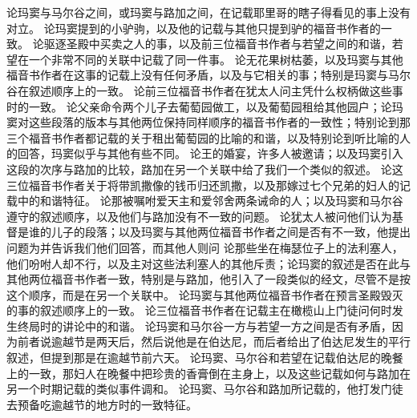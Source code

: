 论玛窦与马尔谷之间，或玛窦与路加之间，在记载耶里哥的瞎子得看见的事上没有对立。\newline{} 论玛窦提到的小驴驹，以及他的记载与其他只提到驴的福音书作者的一致。\newline{} 论驱逐圣殿中买卖之人的事，以及前三位福音书作者与若望之间的和谐，若望在一个非常不同的关联中记载了同一件事。\newline{} 论无花果树枯萎，以及玛窦与其他福音书作者在这事的记载上没有任何矛盾，以及与它相关的事；特别是玛窦与马尔谷在叙述顺序上的一致。\newline{} 论前三位福音书作者在犹太人问主凭什么权柄做这些事时的一致。\newline{} 论父亲命令两个儿子去葡萄园做工，以及葡萄园租给其他园户；论玛窦对这些段落的版本与其他两位保持同样顺序的福音书作者的一致性；特别论到那三个福音书作者都记载的关于租出葡萄园的比喻的和谐，以及特别论到听比喻的人的回答，玛窦似乎与其他有些不同。\newline{} 论王的婚宴，许多人被邀请；以及玛窦引入这段的次序与路加的比较，路加在另一个关联中给了我们一个类似的叙述。\newline{} 论这三位福音书作者关于将带凯撒像的钱币归还凯撒，以及那嫁过七个兄弟的妇人的记载中的和谐特征。\newline{} 论那被嘱咐爱天主和爱邻舍两条诫命的人；以及玛窦和马尔谷遵守的叙述顺序，以及他们与路加没有不一致的问题。\newline{} 论犹太人被问他们认为基督是谁的儿子的段落；以及玛窦与其他两位福音书作者之间是否有不一致，他提出问题为并告诉我们他们回答，而其他人则问\newline{} 论那些坐在梅瑟位子上的法利塞人，他们吩咐人却不行，以及主对这些法利塞人的其他斥责；论玛窦的叙述是否在此与其他两位福音书作者一致，特别是与路加，他引入了一段类似的经文，尽管不是按这个顺序，而是在另一个关联中。\newline{} 论玛窦与其他两位福音书作者在预言圣殿毁灭的事的叙述顺序上的一致。\newline{} 论三位福音书作者在记载主在橄榄山上门徒问何时发生终局时的讲论中的和谐。\newline{} 论玛窦和马尔谷一方与若望一方之间是否有矛盾，因为前者说逾越节是两天后，然后说他是在伯达尼，而后者给出了伯达尼发生的平行叙述，但提到那是在逾越节前六天。\newline{} 论玛窦、马尔谷和若望在记载伯达尼的晚餐上的一致，那妇人在晚餐中把珍贵的香膏倒在主身上，以及这些记载如何与路加在另一个时期记载的类似事件调和。\newline{} 论玛窦、马尔谷和路加所记载的，他打发门徒去预备吃逾越节的地方时的一致特征。\par

